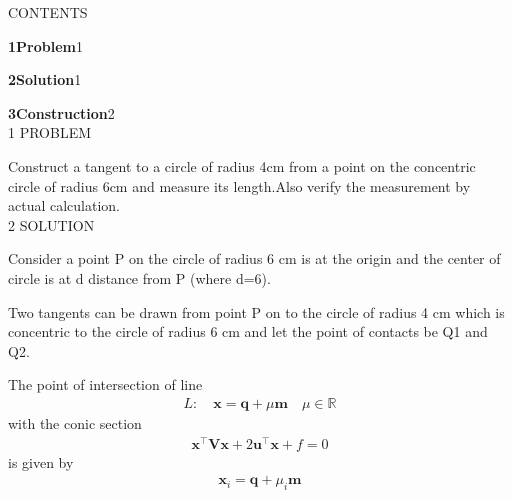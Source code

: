 \documentclass[a4paper,10pt]{report}
\let\vec\mathbf
\begin{document}
\begin{multicols}{2}
\centering \large\textsc{C}\footnotesize\textsc{ONTENTS}\vspace{5mm}\\
\raggedright\large\textbf{1\hspace{1cm}Problem}\hspace{5.2cm}1\vspace{5mm}\\
\raggedright\large\textbf{2\hspace{1cm}Solution}\hspace{5.25cm}1\vspace{5mm}\\
\raggedright\large\textbf{3\hspace{1cm}Construction}\hspace{4.25cm}2\vspace{5mm}\\
\centering \large\textsc{1  P}\footnotesize\textsc{ROBLEM}\vspace{5mm}\\
\raggedright\large{Construct a tangent to a circle of radius 4cm from a point on the concentric circle of radius 6cm and measure its length.Also verify the measurement by actual calculation.}\vspace{5mm}\\
\centering \large\textsc{2  S}\footnotesize\textsc{OLUTION}\vspace{5mm}\\
\raggedright\large{Consider a point P on the circle of radius 6 cm is at the origin and the center of circle is at d distance from P (where d=6).}\vspace{2mm}\\
\raggedright\large{Two tangents can be drawn from point P on to the circle of radius 4 cm which is concentric to the circle of radius 6 cm and let the point of contacts be Q1 and Q2.}\vspace{2mm}\\
\raggedright\large{The point of intersection of line \begin{align}L: \quad \vec{x} = \vec{q} + \mu \vec{m} \quad \mu \in \mathbb{R}\end{align} with the conic section \begin{align}\vec{x}^{\top}\vec{V}\vec{x}+2\vec{u}^{\top}\vec{x}+f=0\end{align} is given by \begin{align}\vec{x}_i = \vec{q} + \mu_i \vec{m}\end{align}}

\end{multicols}
\end{document}
